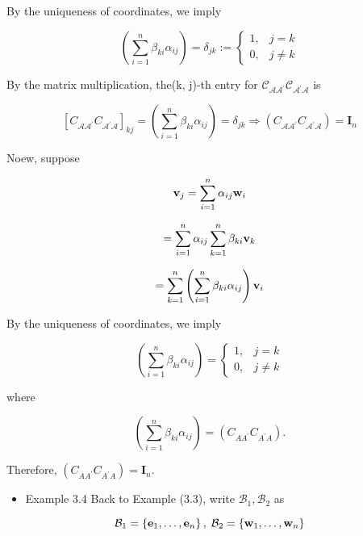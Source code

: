 \documentclass[11pt]{article}
\begin{document}
By the uniqueness of coordinates, we imply

\[
\left( {\mathop{\sum }\limits_{{i = 1}}^n\beta_{ki}\alpha_{ij}}\right)  = {\delta }_{jk} \mathrel{\text{ := }} \left\{  \begin{array}{ll} 1, & j = k \\  0, & j \neq  k \end{array}\right.
\]

By the matrix multiplication, the(k, j)-th entry for \({\mathcal{C}}_{\mathcal{A}{\mathcal{A}}^{\prime }}{\mathcal{C}}_{{\mathcal{A}}^{\prime }\mathcal{A}}\) is

\[
{\left\lbrack  {C}_{\mathcal{A}{\mathcal{A}}^{\prime }}{C}_{{\mathcal{A}}^{\prime }\mathcal{A}}\right\rbrack  }_{kj} = \left( {\mathop{\sum }\limits_{{i = 1}}^n\beta_{ki}\alpha_{ij}}\right)  = {\delta }_{jk} \Rightarrow  \left( {{C}_{\mathcal{A}{\mathcal{A}}^{\prime }}{C}_{{\mathcal{A}}^{\prime }\mathcal{A}}}\right)  = {\mathbf{I}}_n
\]

Noew, suppose

\[
{\bf v}_{j} = \mathop{\sum }\limits_{{i = 1}}^n\alpha_{ij}{\bf w}_{i}
\]

\[
= \mathop{\sum }\limits_{{i = 1}}^n\alpha_{ij}\mathop{\sum }\limits_{{k = 1}}^n\beta_{ki}{\bf v}_{k}
\]

\[
= \mathop{\sum }\limits_{{k = 1}}^n\left( {\mathop{\sum }\limits_{{i = 1}}^n\beta_{ki}\alpha_{ij}}\right) {\bf v}_{i}
\]

By the uniqueness of coordinates, we imply

\[
\left( {\mathop{\sum }\limits_{{i = 1}}^n\beta_{ki}\alpha_{ij}}\right)  = \left\{  \begin{array}{ll} 1, & j = k \\  0, & j \neq  k \end{array}\right.
\]

where

\[
\left( {\mathop{\sum }\limits_{{i = 1}}^n\beta_{ki}\alpha_{ij}}\right)  = \left( {{C}_{A{A}^{\prime }}{C}_{{A}^{\prime }A}}\right) .
\]

Therefore, \(\left( {{C}_{A{A}^{\prime }}{C}_{{A}^{\prime }A}}\right)  = {\mathbf{I}}_n\).

\begin{itemize}
\item Example 3.4 Back to Example (3.3), write \({\mathcal{B}}_1,{\mathcal{B}}_2\) as
\end{itemize}

\[
{\mathcal{B}}_1 = \left\{  {{\mathbf{e}}_1,\ldots ,{\mathbf{e}}_n}\right\}  ,\;{\mathcal{B}}_2 = \left\{  {{\bf w}_1,\ldots ,{\bf w}_n}\right\}
\]
\end{document}
